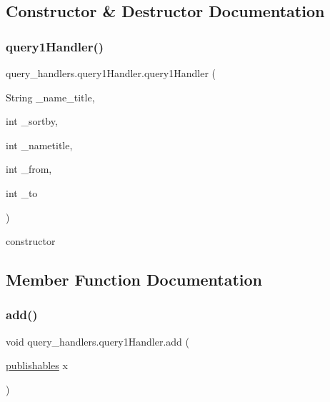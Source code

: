 \subsection{Constructor \& Destructor Documentation}
\hypertarget{classquery__handlers_1_1query1_handler_a6fe01c044940a164a6c56149fd031131}{}\label{classquery__handlers_1_1query1_handler_a6fe01c044940a164a6c56149fd031131} 
\subsubsection{\texorpdfstring{query1\+Handler()}{query1Handler()}}
{\footnotesize\ttfamily query\+\_\+handlers.\+query1\+Handler.\+query1\+Handler (\begin{DoxyParamCaption}\item[{String}]{\+\_\+name\+\_\+title,  }\item[{int}]{\+\_\+sortby,  }\item[{int}]{\+\_\+nametitle,  }\item[{int}]{\+\_\+from,  }\item[{int}]{\+\_\+to }\end{DoxyParamCaption})}



constructor 



\subsection{Member Function Documentation}
\hypertarget{classquery__handlers_1_1query1_handler_a139b0b15be5b2a7ac0b58a70906fb2a0}{}\label{classquery__handlers_1_1query1_handler_a139b0b15be5b2a7ac0b58a70906fb2a0} 
\subsubsection{\texorpdfstring{add()}{add()}}
{\footnotesize\ttfamily void query\+\_\+handlers.\+query1\+Handler.\+add (\begin{DoxyParamCaption}\item[{\hyperlink{class_data_1_1publishables}{publishables}}]{x }\end{DoxyParamCaption})}


